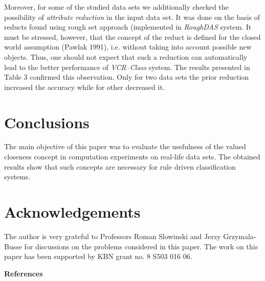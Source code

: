 Moreover, for  some  of  the  studied  data  sets   we   additionally
checked the possibility of {\it attribute reduction} in   the   input
data set.  It  was  done  on   the   basis   of
reducts  found  using  rough  set   approach  (implemented  in   {\it
RoughDAS} system. It must be stressed, however, that the
concept of the reduct is defined for the closed world assumption
(Pawlak 1991), i.e. without taking into account possible new objects.
Thus, one should not expect that such a reduction can automatically lead
to the better performance of {\it VCR--Class} system. The results presented
in Table 3 confirmed this observation. Only for two  data  sets  the
prior reduction  increased  the  accuracy  while  for  other
decreased it.

\section{Conclusions}

The main objective of this paper was to evaluate  the  usefulness  of
the valued closeness concept in computation experiments on real-life
data sets. The obtained results show that such concepts are necessary
for rule driven classification systems.

\section{Acknowledgements}

The  author  is  very  grateful  to   Professors   Roman   Slowinski
and Jerzy Grzymala-Busse for discussions on the problems considered
in this paper. The work on  this  paper  has been supported by KBN
grant no. 8 S503 016 06.\\

\vspace{1cm}

{\Large \bf References}\\


